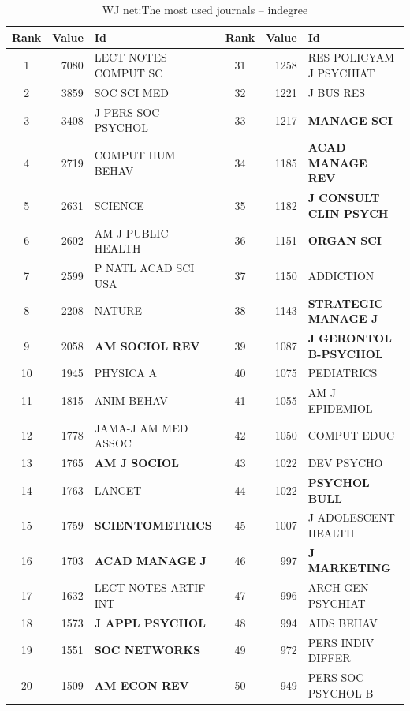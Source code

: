 \documentclass[11pt]{article} %
\begin{document}
\begin{table}
\caption{WJ net:\label{jourind}The most used journals -- indegree}\medskip
\small
\renewcommand{\arraystretch}{0.95}
\begin{tabular}{c|r|l||c|r|l}
Rank&   	Value&   	Id&   	Rank&   	Value&   	Id \\ \hline
1&   	7080&   	LECT NOTES COMPUT SC&   	31&   	1258&   	RES POLICY{AM J PSYCHIAT}\\   
2&   	3859&   	SOC SCI MED&   	32&   	1221&   	J BUS RES\\   
3&   	3408&   	J PERS SOC PSYCHOL&   	33&   	1217&   	\textbf{MANAGE SCI}\\   
4&   	2719&   	COMPUT HUM BEHAV&   	34&   	1185&   	\textbf{ACAD MANAGE REV}\\   
5&   	2631&   	SCIENCE&   	35&   	1182&   	\textbf{J CONSULT CLIN PSYCH}\\   
6&   	2602&   	AM J PUBLIC HEALTH&   	36&   	1151&  \textbf {ORGAN SCI}\\   
7&   	2599&   	P NATL ACAD SCI USA&   	37&   	1150&   	ADDICTION\\   
8&   	2208&   	NATURE&   	38&   	1143&   	\textbf{STRATEGIC MANAGE J}\\   
9&   	2058&   	\textbf{AM SOCIOL REV}&   	39&   	1087&   	\textbf{J GERONTOL B-PSYCHOL}\\   
10&   	1945&   	PHYSICA A&   	40&   	1075&   	PEDIATRICS\\   
11&   	1815&   	ANIM BEHAV&   	41&   	1055&   	AM J EPIDEMIOL\\   
12&   	1778&   	JAMA-J AM MED ASSOC&   	42&   	1050&   	COMPUT EDUC\\   
13&   	1765&   	\textbf{AM J SOCIOL}&    43&   1022&   	DEV PSYCHO\\   
14&   	1763&   	LANCET&   		44&   	1022&   	\textbf{PSYCHOL BULL}\\   
15&   	1759&   	\textbf{SCIENTOMETRICS}&   	45&   	1007&   	J ADOLESCENT HEALTH\\   
16&   	1703&   	\textbf{ACAD MANAGE J}&   	46&   	997&   	\textbf{J MARKETING}\\   
17&   	1632&   	LECT NOTES ARTIF INT&   	47&   	996&   	ARCH GEN PSYCHIAT\\   
18&   	1573&   	\textbf{J APPL PSYCHOL}&   	48&   	994&   	AIDS BEHAV\\   
19&   	1551&   	\textbf{SOC NETWORKS}&   	49&   	972&   	PERS INDIV DIFFER\\   
20&   	1509&   	\textbf{AM ECON REV}&   	50&   	949&   	PERS SOC PSYCHOL B\\   

\end{tabular}
\end{table}
\end{document}

